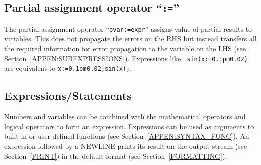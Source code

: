 \documentclass[11pt]{article}
\begin{document}
\subsection{Partial assignment operator ``{\tt :=}''}
The partial assignment operator ``{\tt pvar:=expr}'' assigns value of partial results to
variables.  This does not propagate the errors on the RHS but instead transfers all the
required information for error propagation to the variable on the LHS (see
Section~\ref{APPEN:SUBEXPRESSIONS}).  Expressions like {\tt
  sin(x:=0.1pm0.02)} are equivalent to {\tt x:=0.1pm0.02;sin(x);}.

\subsection{Expressions/Statements}
\label{APPEN:SYNTAX_EXPR}

Numbers and variables can be combined with the mathematical operators
and logical operators to form an expression.  Expressions can be used
as arguments to built-in or user-defined functions (see
Section~\ref{APPEN:SYNTAX_FUNC}).  An expression followed by a NEWLINE
prints its result on the output stream (see Section~\ref{PRINT}) in
the default format (see Section~\ref{FORMATTING}).
\end{document}

